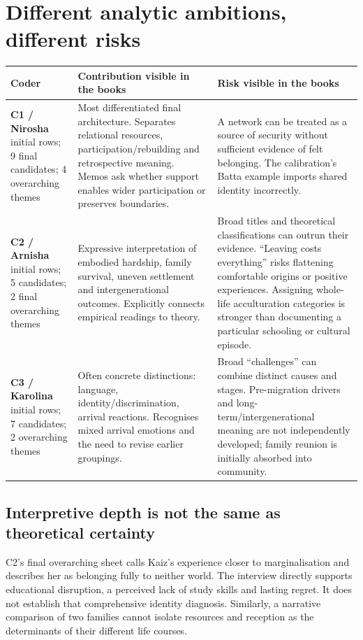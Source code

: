 \documentclass[10pt,a4paper]{article}
\newcommand{\kicker}[1]{{\sffamily\small\bfseries\color{teal}#1}\par\vspace{5pt}}
\newcommand{\page}[2]{\clearpage\kicker{#1}\section*{#2}}
\begin{document}
\page{05 / THE INDIVIDUAL HUMAN READINGS}{Different analytic ambitions, different risks}
\begin{tabularx}{\linewidth}{@{}p{2.7cm}YY@{}}
\toprule
\textbf{Coder} & \textbf{Contribution visible in the books} & \textbf{Risk visible in the books}\tabularnewline\midrule
\textbf{C1 / Nirosha} initial rows; 9 final candidates; 4 overarching themes & Most differentiated final architecture. Separates relational resources, participation/rebuilding and retrospective meaning. Memos ask whether support enables wider participation or preserves boundaries. & A network can be treated as a source of security without sufficient evidence of felt belonging. The calibration's Batta example imports shared identity incorrectly.\tabularnewline
\textbf{C2 / Arnisha} initial rows; 5 candidates; 2 final overarching themes & Expressive interpretation of embodied hardship, family survival, uneven settlement and intergenerational outcomes. Explicitly connects empirical readings to theory. & Broad titles and theoretical classifications can outrun their evidence. ``Leaving costs everything'' risks flattening comfortable origins or positive experiences. Assigning whole-life acculturation categories is stronger than documenting a particular schooling or cultural episode.\tabularnewline
\textbf{C3 / Karolina} initial rows; 7 candidates; 2 overarching themes & Often concrete distinctions: language, identity/discrimination, arrival reactions. Recognises mixed arrival emotions and the need to revise earlier groupings. & Broad ``challenges'' can combine distinct causes and stages. Pre-migration drivers and long-term/intergenerational meaning are not independently developed; family reunion is initially absorbed into community.\tabularnewline\bottomrule
\end{tabularx}

\subsection*{Interpretive depth is not the same as theoretical certainty}
C2's final overarching sheet calls Kaiz's experience closer to marginalisation and describes her as belonging fully to neither world. The interview directly supports educational disruption, a perceived lack of study skills and lasting regret. It does not establish that comprehensive identity diagnosis. Similarly, a narrative comparison of two families cannot isolate resources and reception as the determinants of their different life courses.
\end{document}
